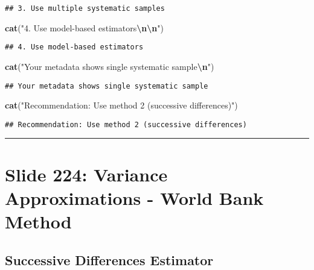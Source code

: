 \documentclass[
]{article}
\newenvironment{Shaded}{\begin{snugshade}}{\end{snugshade}}
\newcommand{\FunctionTok}[1]{\textcolor[rgb]{0.13,0.29,0.53}{\textbf{#1}}}
\newcommand{\NormalTok}[1]{#1}
\newcommand{\SpecialCharTok}[1]{\textcolor[rgb]{0.81,0.36,0.00}{\textbf{#1}}}
\newcommand{\StringTok}[1]{\textcolor[rgb]{0.31,0.60,0.02}{#1}}
\begin{document}
\begin{verbatim}
## 3. Use multiple systematic samples
\end{verbatim}

\begin{Shaded}
\begin{Highlighting}[]
\FunctionTok{cat}\NormalTok{(}\StringTok{"4. Use model{-}based estimators}\SpecialCharTok{\textbackslash{}n\textbackslash{}n}\StringTok{"}\NormalTok{)}
\end{Highlighting}
\end{Shaded}

\begin{verbatim}
## 4. Use model-based estimators
\end{verbatim}

\begin{Shaded}
\begin{Highlighting}[]
\FunctionTok{cat}\NormalTok{(}\StringTok{"Your metadata shows single systematic sample}\SpecialCharTok{\textbackslash{}n}\StringTok{"}\NormalTok{)}
\end{Highlighting}
\end{Shaded}

\begin{verbatim}
## Your metadata shows single systematic sample
\end{verbatim}

\begin{Shaded}
\begin{Highlighting}[]
\FunctionTok{cat}\NormalTok{(}\StringTok{"Recommendation: Use method 2 (successive differences)"}\NormalTok{)}
\end{Highlighting}
\end{Shaded}

\begin{verbatim}
## Recommendation: Use method 2 (successive differences)
\end{verbatim}

\begin{center}\rule{0.5\linewidth}{0.5pt}\end{center}

\section{Slide 224: Variance Approximations - World Bank
Method}\label{slide-224-variance-approximations---world-bank-method}

\subsection{Successive Differences
Estimator}\label{successive-differences-estimator}
\end{document}
